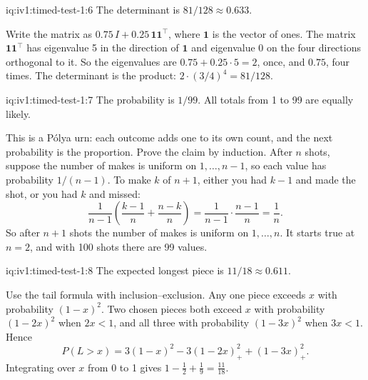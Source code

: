 \begin{solution}{iq:iv1:timed-test-1:6}
The determinant is $81/128 \approx 0.633$.

Write the matrix as $0.75\,I + 0.25\,\mathbf{1}\mathbf{1}^\top$, where $\mathbf{1}$ is the vector of ones. The matrix $\mathbf{1}\mathbf{1}^\top$ has eigenvalue 5 in the direction of $\mathbf{1}$ and eigenvalue 0 on the four directions orthogonal to it. So the eigenvalues are $0.75 + 0.25 \cdot 5 = 2$, once, and $0.75$, four times. The determinant is the product: $2 \cdot (3/4)^4 = 81/128$.

\end{solution}

\begin{solution}{iq:iv1:timed-test-1:7}
The probability is $1/99$. All totals from 1 to 99 are equally likely.

This is a P\'olya urn: each outcome adds one to its own count, and the next probability is the proportion. Prove the claim by induction. After $n$ shots, suppose the number of makes is uniform on $1, \dots, n - 1$, so each value has probability $1/(n - 1)$. To make $k$ of $n + 1$, either you had $k - 1$ and made the shot, or you had $k$ and missed:
\[
\frac{1}{n - 1}\left(\frac{k - 1}{n} + \frac{n - k}{n}\right) = \frac{1}{n - 1}\cdot\frac{n - 1}{n} = \frac1n .
\]
So after $n + 1$ shots the number of makes is uniform on $1, \dots, n$. It starts true at $n = 2$, and with 100 shots there are 99 values.

\end{solution}

\enlargethispage{-4\baselineskip}%
\begin{solution}{iq:iv1:timed-test-1:8}
The expected longest piece is $11/18 \approx 0.611$.

Use the tail formula with inclusion--exclusion. Any one piece exceeds $x$ with probability $(1 - x)^2$. Two chosen pieces both exceed $x$ with probability $(1 - 2x)^2$ when $2x < 1$, and all three with probability $(1 - 3x)^2$ when $3x < 1$. Hence
\[
P(L > x) = 3(1 - x)^2 - 3(1 - 2x)_+^2 + (1 - 3x)_+^2 .
\]
Integrating over $x$ from 0 to 1 gives $1 - \tfrac12 + \tfrac19 = \tfrac{11}{18}$.

\end{solution}

